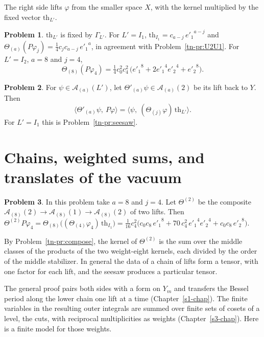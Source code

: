 \documentclass[reqno]{amsart}
\newcounter{chap}
\theoremstyle{definition}
\newtheorem{problem}{Problem}[section]
\theoremstyle{plain}
\newcommand{\Ac}{\mathcal{A}}
\begin{document}
The right side lifts \(\varphi\) from the smaller space \(X\), with the kernel multiplied by the fixed vector \(\mathrm{th}_{L'}\).

\begin{problem}\label{pr:theta-vector}
\(\mathrm{th}_{L'}\) is fixed by \(\Gamma_{L'}\).  For \(L' = I_1\), \(\mathrm{th}_{I_1} = c_{a-j}\, {e'_1}^{a-j}\) and \(\Theta_{(a)}(P\varphi_j) = \tfrac14 c_j c_{a-j}\, {e'_1}^a\), in agreement with Problem~\ref{tn-pr:U2U1}.  For \(L' = I_2\), \(a = 8\) and \(j = 4\),
\[
  \Theta_{(8)}(P\varphi_4) = \tfrac14 c_0^2 c_4^2\,\bigl({e'_1}^8 + 2 {e'_1}^4 {e'_2}^4 + {e'_2}^8\bigr) .
\]
\end{problem}

\begin{problem}\label{pr:transpose}
For \(\psi \in \Ac_{(a)}(L')\), let \(\Theta'_{(a)}\psi \in \Ac_{(a)}(2)\) be its lift back to \(Y\).  Then
\[
  \bigl\langle \Theta'_{(a)}\psi,\ P\varphi \bigr\rangle = \bigl\langle \psi,\ (\Theta_{(j)}\varphi)\, \mathrm{th}_{L'} \bigr\rangle .
\]
For \(L' = I_1\) this is Problem~\ref{tn-pr:seesaw}.
\end{problem}


\section{Chains, weighted sums, and translates of the vacuum}\label{sec:chain}

\begin{problem}\label{pr:chain-toy}
In this problem take \(a = 8\) and \(j = 4\).  Let \(\Theta^{(2)}\) be the composite \(\Ac_{(8)}(2) \to \Ac_{(8)}(1) \to \Ac_{(8)}(2)\) of two lifts.  Then \(\Theta^{(2)}P\varphi_4 = \Theta_{(8)}\bigl((\Theta_{(4)}\varphi_4)\,\mathrm{th}_{I_1}\bigr) = \tfrac1{16} c_4^2\bigl(c_0c_8\, {e'_1}^8 + 70\, c_4^2\, {e'_1}^4 {e'_2}^4 + c_0c_8\, {e'_2}^8\bigr)\).
\end{problem}

By Problem~\ref{tn-pr:compose}, the kernel of \(\Theta^{(2)}\) is the sum over the middle classes of the products of the two weight-eight kernels, each divided by the order of the middle stabilizer.  In general the data of a chain of lifts form a tensor, with one factor for each lift, and the seesaw produces a particular tensor.

The general proof pairs both sides with a form on \(Y_m\) and transfers the Bessel period along the lower chain one lift at a time (Chapter~\ref{s1-chap}).  The finite variables in the resulting outer integrals are summed over finite sets of cosets of a level, the cuts, with reciprocal multiplicities as weights (Chapter~\ref{s3-chap}).  Here is a finite model for those weights.
\end{document}
